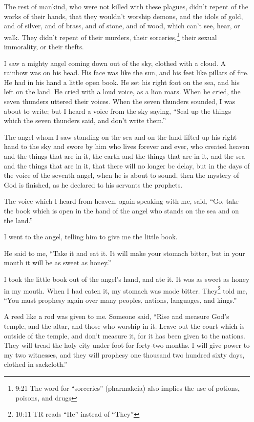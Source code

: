 \myverse{}The rest of mankind, who were not killed with these plagues,
didn’t repent of the works of their hands, that they wouldn’t worship demons, and the idols of gold, and
of silver, and of brass, and of stone, and of wood, which can’t see, hear, or walk.
\myverse{}They didn’t repent of their murders, their sorceries,\footnote{9:21 The word for “sorceries” (pharmakeia) also implies the use of potions, poisons, and drugs}
their sexual immorality, or their thefts.



\mychapter{} \myverse*{}I saw a mighty angel coming down out of the sky, clothed with
a cloud. A rainbow was on his head. His face was like the sun, and his feet like pillars of fire.
\myverse{}He had in his hand a little open book. He set his right foot on the sea, and
his left on the land.
\myverse{}He cried with a loud voice, as a lion roars. When he cried, the seven thunders
uttered their voices.
\myverse{}When the seven thunders sounded, I was about to write; but I heard a voice
from the sky saying, “Seal up the things which the seven thunders said, and don’t write them.”

\myverse{}The angel whom I saw standing on the sea and on the land lifted
up his right hand to the sky
\myverse{}and swore by him who lives forever and ever, who created heaven and the things
that are in it, the earth and the things that are in it, and the sea and the things that are in it, that
there will no longer be delay,
\myverse{}but in the days of the voice of the seventh angel, when he is about to sound,
then the mystery of God is finished, as he declared to his servants the prophets.

\myverse{}The voice which I heard from heaven, again speaking with me, said,
“Go, take the book which is open in the hand of the angel who stands on the sea and on the land.”

\myverse{}I went to the angel, telling him to give me the little book.

He said to me, “Take it and eat it. It will make your stomach bitter, but in your mouth it
will be as sweet as honey.”

\myverse{}I took the little book out of the angel’s hand, and ate it.
It was as sweet as honey in my mouth. When I had eaten it, my stomach was made bitter.
\myverse{}They\footnote{10:11 TR reads “He” instead of “They”} told me, “You must prophesy again over many peoples,
nations, languages, and kings.”



\mychapter{} \myverse*{}A reed like a rod was given to me. Someone said, “Rise and measure
God’s temple, and the altar, and those who worship in it.
\myverse{}Leave out the court which is outside of the temple, and don’t measure it, for
it has been given to the nations. They will tread the holy city under foot for forty-two months.
\myverse{}I will give power to my two witnesses, and they will prophesy one thousand
two hundred sixty days, clothed in sackcloth.”

